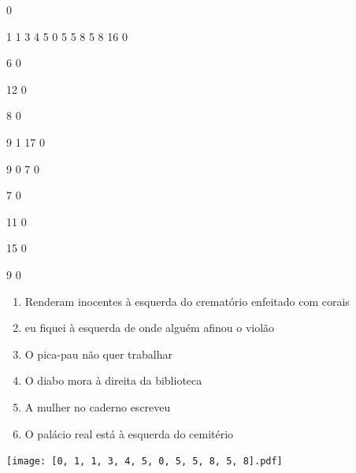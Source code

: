 \documentclass[12pt]{article}
\begin{document}
		\vfill  
		  
{
	0	%

	1	%
	1	%
	3	%
	4	%
	5	%
	0	%
	5	%
	5	%
	8	%
	5	%
	8	%
	16	%
	0	%

	6	%
	0	%

	12	%
	0	%

	8	%
	0	%

	9	%
	1	%
	17	%
	0	%

	9	%
	0	%
	7	%
	0	%

	7	%
	0	%

	11	%
	0	%

	15	%
	0	%

	9	%
	0	%

}	  
		    	

		 

\pagebreak


	\begin{enumerate}
		  \sffamily %
		  \large %


\vfill \item
Renderam inocentes	%
à esquerda
do crematório enfeitado com corais	%

\vfill \item
eu fiquei	%
à esquerda
de onde alguém afinou o violão	%

\vfill \item
O pica-pau não	%
quer trabalhar	%

\vfill \item
O diabo mora	%
à direita
da biblioteca	%

\vfill \item
A mulher	%
no caderno escreveu	%

\vfill \item
O palácio real está	%
à esquerda
do cemitério	%
	\end{enumerate}
		  
		  \hfill

		  \vfill

\texttt{[image: [0, 1, 1, 3, 4, 5, 0, 5, 5, 8, 5, 8].pdf]}


	\hfill	  	  

\end{document}
